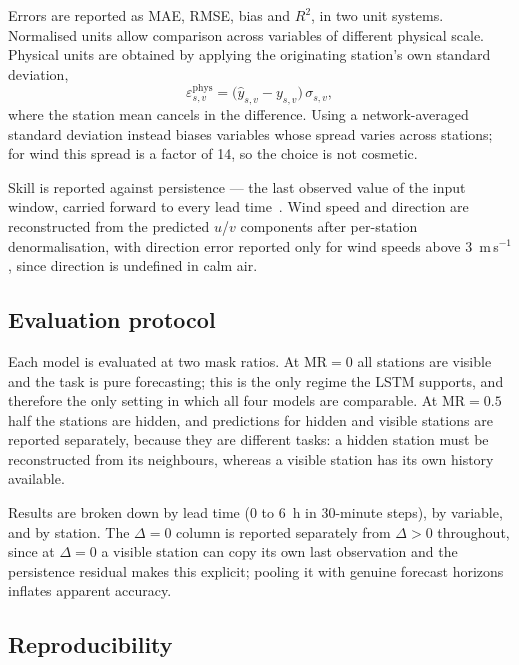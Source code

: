 Errors are reported as MAE, RMSE, bias and $R^2$, in two unit systems.
Normalised units allow comparison across variables of different physical scale.
Physical units are obtained by applying the originating station's own standard
deviation,
%
\begin{equation}
  \varepsilon^{\text{phys}}_{s,v}
    = \big(\hat{y}_{s,v} - y_{s,v}\big)\,\sigma_{s,v},
  \label{eq:denorm}
\end{equation}
%
where the station mean cancels in the difference. Using a network-averaged
standard deviation instead biases variables whose spread varies across stations;
for wind this spread is a factor of 14, so the choice is not cosmetic.

Skill is reported against persistence --- the last observed value of the input
window, carried forward to every lead time~\cite{Murphy1988SkillScores}. Wind
speed and direction are reconstructed from the predicted $u$/$v$ components
after per-station denormalisation, with direction error reported only for wind
speeds above 3~m\,s$^{-1}$, since direction is undefined in calm air.

\subsection{Evaluation protocol}
\label{sec:setup:protocol}

Each model is evaluated at two mask ratios. At $\text{MR} = 0$ all stations are
visible and the task is pure forecasting; this is the only regime the LSTM
supports, and therefore the only setting in which all four models are
comparable. At $\text{MR} = 0.5$ half the stations are hidden, and predictions
for hidden and visible stations are reported separately, because they are
different tasks: a hidden station must be reconstructed from its neighbours,
whereas a visible station has its own history available.

Results are broken down by lead time (0 to 6~h in 30-minute steps), by variable,
and by station. The $\Delta = 0$ column is reported separately from $\Delta > 0$
throughout, since at $\Delta = 0$ a visible station can copy its own last
observation and the persistence residual makes this explicit; pooling it with
genuine forecast horizons inflates apparent accuracy.

\subsection{Reproducibility}
\label{sec:setup:repro}

